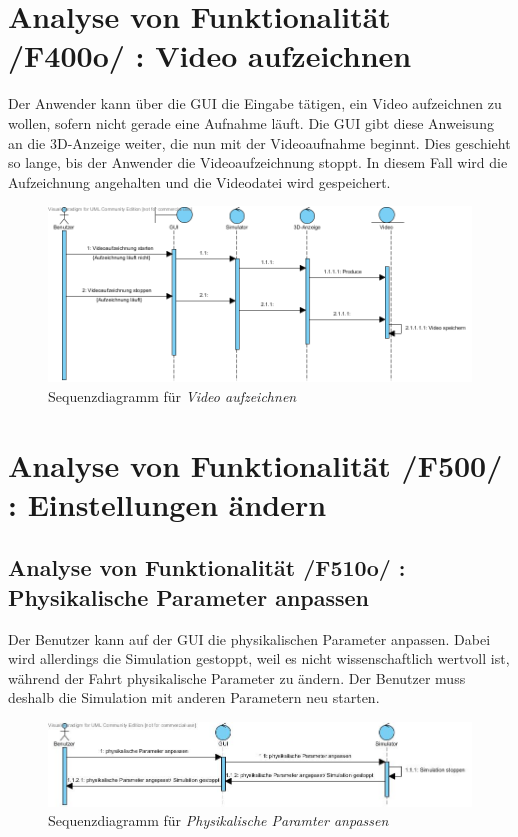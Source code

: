 \section{Analyse von Funktionalität /F400o/ :  Video aufzeichnen}
Der Anwender kann über die GUI die Eingabe tätigen, ein Video aufzeichnen zu wollen, sofern nicht gerade eine Aufnahme läuft. Die GUI gibt diese Anweisung an die 3D-Anzeige weiter, die nun mit der
Videoaufnahme beginnt. Dies geschieht so lange, bis der Anwender die Videoaufzeichnung stoppt. In diesem Fall wird die Aufzeichnung angehalten und die Videodatei wird gespeichert.


\begin{figure}
\includegraphics[width=16cm]{bilder/Video_aufzeichnen}
\caption{Sequenzdiagramm für \textit{Video aufzeichnen}}
\label{labelname}
\end{figure}

\section{Analyse von Funktionalität /F500/ :  Einstellungen ändern}
\subsection{Analyse von Funktionalität /F510o/ :  Physikalische Parameter anpassen}
Der Benutzer kann auf der GUI die physikalischen Parameter anpassen. Dabei wird allerdings die Simulation gestoppt, weil es nicht wissenschaftlich wertvoll ist, während der Fahrt physikalische Parameter zu ändern. Der Benutzer muss deshalb die Simulation mit anderen Parametern neu starten.

\begin{figure}
\includegraphics[width=16cm]{bilder/Physikalische_Parameter_anpassen.jpg}
\caption{Sequenzdiagramm für \textit{Physikalische Paramter anpassen}}
\label{labelname}
\end{figure}

